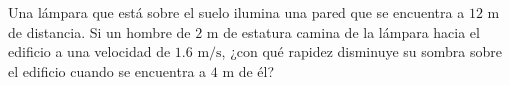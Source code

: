 \item Una lámpara que está sobre el suelo ilumina una pared que se encuentra a $12 \text{ m}$ de distancia. Si un hombre de $2 \text{ m}$ de estatura camina de la lámpara hacia el edificio a una velocidad de $1.6 \text{ m/s}$, ¿con qué rapidez disminuye su sombra sobre el edificio cuando se encuentra a $4 \text{ m}$ de él?
